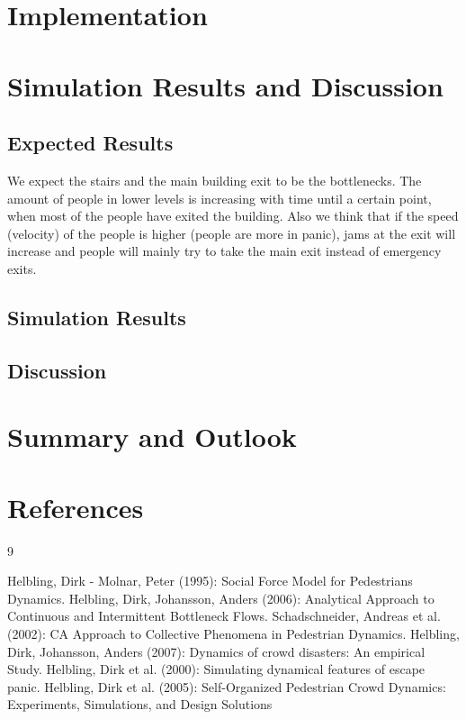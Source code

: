 \documentclass[11pt]{article}
\begin{document}
\section{Implementation}

\section{Simulation Results and Discussion}

\subsection{Expected Results}

We expect the stairs and the main building exit to be the bottlenecks. The amount of people in lower levels is increasing with time until a certain point, when most of the people have exited the building. Also we think that if the speed (velocity) of the people is higher (people are more in panic), jams at the exit will increase and people will mainly try to take the main exit instead of emergency exits.

\subsection{Simulation Results}

\subsection{Discussion}


\section{Summary and Outlook}


\section{References}

\begin{thebibliography} {9}
	
	 Helbling, Dirk - Molnar, Peter (1995): Social Force Model for Pedestrians Dynamics.
	 Helbling, Dirk, Johansson, Anders (2006): Analytical Approach to Continuous and Intermittent Bottleneck Flows.
	 Schadschneider, Andreas et al. (2002): CA Approach to Collective Phenomena in Pedestrian Dynamics.	
	 Helbling, Dirk, Johansson, Anders (2007): Dynamics of crowd disasters: An empirical Study.
	 Helbling, Dirk et al. (2000): Simulating dynamical features of escape panic.
	 Helbling, Dirk et al. (2005): Self-Organized Pedestrian Crowd Dynamics: Experiments, Simulations, and Design Solutions

\end{thebibliography}

\end{document}
